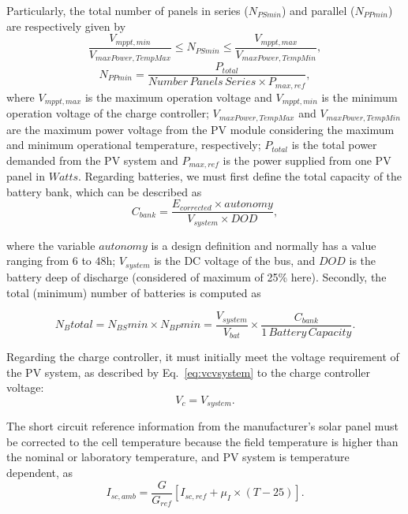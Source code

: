 \documentclass[review]{elsarticle}
\begin{document}
Particularly, the total number of panels in series ($N_{PSmin}$) and parallel ($N_{PPmin}$) are respectively given by
%
\begin{equation}
\label{eq:NPSmin}
\dfrac{V_{mppt,min}}{V_{maxPower,TempMax}} \leq N_{PSmin} \leq \dfrac{V_{mppt,max}}{V_{maxPower,TempMin}},
\end{equation}
%
\begin{equation}
\label{eq:NPPmin}
N_{PPmin} = \dfrac{P_{total}}{Number\,Panels\,Series \times P_{max,ref}},
\end{equation}
%
\noindent where $V_{mppt,max}$ is the maximum operation voltage and $V_{mppt,min}$ 
is the minimum operation voltage of the charge controller; $V_{maxPower,TempMax}$ and 
$V_{maxPower,TempMin}$ are the maximum power voltage from the PV module considering 
the maximum and minimum operational temperature, respectively; 
$P_{total}$ is the total power demanded from the PV system and 
$P_{max,ref}$ is the power supplied from one PV panel in $Watts$.
Regarding batteries, we must first define the total capacity of the battery bank, which can be described as
%
\begin{equation}
\label{eq:Cbank}
C_{bank} = \dfrac{E_{corrected} \times autonomy}{V_{system} \times DOD},
\end{equation}

\noindent where the variable $autonomy$ is a design definition and normally has a value ranging from $6$ to $48$h; 
$ V_{system} $ is the DC voltage of the bus, and $ DOD $ is the battery deep of discharge (considered of maximum of 25\% here).
%
Secondly, the total (minimum) number of batteries is computed as 

\begin{equation}
\label{eq:Nbtotal}
N_{B}total = N_{BS}min \times N_{BP}min = \dfrac{V_{system}}{V_{bat}} \times \dfrac{C_{bank}}{1 \,Battery \, Capacity}.
\end{equation}

Regarding the charge controller, it must initially meet the voltage requirement of the PV system, as described by Eq.~\eqref{eq:vcvsystem} to the charge controller voltage: 
\begin{equation}
\label{eq:vcvsystem}
V_{c} = V_{system}.
\end{equation}

The short circuit reference information from the manufacturer's solar panel must be corrected 
to the cell temperature because the field temperature is higher than the nominal or laboratory temperature, 
and PV system is temperature dependent, as 
%
\begin{equation}
\label{eq:iscamb}
I_{sc,amb} = \dfrac{G}{G_{ref}} \left[ I_{sc,ref} + \mu_{I} \times (T-25) \right]. 
\end{equation}
\end{document}
